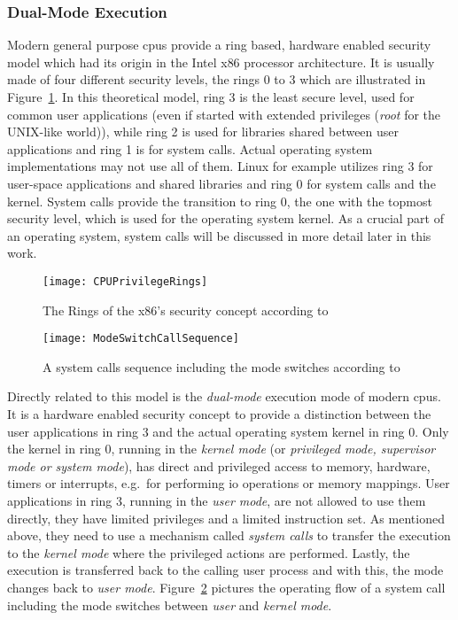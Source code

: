 \subsubsection*{Dual-Mode Execution}
Modern general purpose \acp{cpu} provide a ring based, hardware enabled security model which had its origin in the Intel x86 processor architecture\cite{tanenbaum-modern-operating-systems}.
It is usually made of four different security levels, the rings 0 to 3 which are illustrated in Figure~\ref{pic:x86rings}.
In this theoretical model, ring 3 is the least secure level, used for common user applications (even if started with extended privileges (\textit{root} for the UNIX-like world)), while ring 2 is used for libraries shared between user applications and ring 1 is for system calls\cite{glatz2015betriebssysteme}.
Actual operating system implementations may not use all of them.
Linux for example utilizes ring 3 for user-space applications and shared libraries and ring 0 for system calls and the kernel.
System calls provide the transition to ring 0, the one with the topmost security level, which is used for the operating system kernel.
As a crucial part of an operating system, system calls will be discussed in more detail later in this work.
%
\begin{figure} [t]
	\centering
	\texttt{[image: CPUPrivilegeRings]}
	\caption{The Rings of the x86's security concept according to~\cite{glatz2015betriebssysteme}}\label{pic:x86rings}
\end{figure}
%
\begin{figure} [t]
	\centering
	\texttt{[image: ModeSwitchCallSequence]}
    \caption{A system calls sequence including the mode switches according to~\cite{glatz2015betriebssysteme}}\label{pic:mode-switches}
\end{figure} %
%
Directly related to this model is the \textit{dual-mode} execution mode of modern \acp{cpu}.
It is a hardware enabled security concept to provide a distinction between the user applications in ring 3 and the actual operating system kernel in ring 0.
Only the kernel in ring 0, running in the \textit{kernel mode} (or \textit{privileged mode, supervisor mode or system mode}), has direct and privileged access to memory, hardware, timers or interrupts, e.g.\ for performing \ac{io} operations or memory mappings\cite{lfd430}.
User applications in ring 3, running in the \textit{user mode}, are not allowed to use them directly, they have limited privileges and a limited instruction set.
As mentioned above, they need to use a mechanism called \textit{system calls} to transfer the execution to the \textit{kernel mode} where the privileged actions are performed.
Lastly, the execution is transferred back to the calling user process and with this, the mode changes back to \textit{user mode}.
Figure~\ref{pic:mode-switches} pictures the operating flow of a system call including the mode switches between \textit{user} and \textit{kernel mode}.


